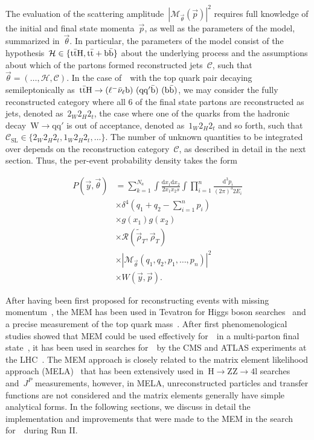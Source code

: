 The evaluation of the scattering amplitude~$|\mathcal{M}_{\vec{\theta}}(\vec{p})|^2$ requires full knowledge of the initial and final state momenta~$\vec{p}$, as well as the parameters of the model, summarized in~$\vec{\theta}$. In particular, the parameters of the model consist of the hypothesis~$\mathcal{H} \in \{\mathrm{t} \bar{\mathrm{t}} \mathrm{H}, \mathrm{t} \bar{\mathrm{t}} + \mathrm{b}\bar{\mathrm{b}}\}$ about the underlying process and the assumptions about which of the partons formed reconstructed jets~$\mathcal{C}$, such that~$\vec{\theta} = (\dots, \mathcal{H}, \mathcal{C})$. In the case of~\ttH~with the top quark pair decaying semileptonically as~$\mathrm{t} \bar{\mathrm{t}} \mathrm{H} \rightarrow (\ell^- \bar{\mathrm{\nu}}_\ell \mathrm{b})\ (\mathrm{q} \mathrm{q}' \bar{\mathrm{b}})\ (\mathrm{b} \bar{\mathrm{b}})$, we may consider the fully reconstructed category where all 6 of the final state partons are reconstructed as jets, denoted as~$2_W 2_H 2_t$, the case where one of the quarks from the hadronic decay~$\mathrm{W} \rightarrow \mathrm{q} \mathrm{q}'$ is out of acceptance, denoted as~$1_W 2_H 2_t$ and so forth, such that~$\mathcal{C}_{\mathrm{SL}} \in \{ 2_W 2_H 2_t, 1_W 2_H 2_t, \dots \}$. The number of unknown quantities to be integrated over depends on the reconstruction category~$\mathcal{C}$, as described in detail in the next section. 
Thus, the per-event probability density takes the form

\begin{align}
\label{eq:mem_definition}
P(\vec{y}, \vec{\theta}) &= \sum_{k=1}^{N_a} \int \frac{\mathrm{d}x_1 \mathrm{d}x_2}{2 x_1 x_2 s} \int \prod_{i=1}^{n} \frac{\mathrm{d}^3 p_i}{(2\pi)^3 2 E_i} \\
&\times \delta^4 (q_1 + q_2 - \sum_{i=1}^n p_i)\\
&\times g(x_1) g(x_2) \\ 
&\times \mathcal{R}(\tilde{\vec{\rho}}_T, \vec{\rho}_T) \\ 
&\times |\mathcal{M}_{\vec{\theta}}(q_1, q_2, p_1, \dots, p_n)|^2 \\
&\times W(\vec{y}, \vec{p}).
\end{align}

After having been first proposed for reconstructing events with missing momentum~\cite{Kondo:1988yd}, the MEM has been used in Tevatron for Higgs boson searches~\cite{Aaltonen:2009dh,Aaltonen:2011rt} and a precise measurement of the top quark mass~\cite{D0topmass2004}. After first phenomenological studies showed that MEM could be used effectively for~\ttH~in a multi-parton final state~\cite{Artoisenet:2013vfa}, it has been used in searches for~\ttHbb~by the CMS and ATLAS experiments at the LHC~\cite{Aad:2015gra,Khachatryan:2015ila}. The MEM approach is closely related to the matrix element likelihood approach (MELA)~\cite{Gao:2010qx} that has been extensively used in~$\mathrm{H} \rightarrow \mathrm{ZZ} \rightarrow 4\mathrm{l}$ searches and~$J^P$ measurements, however, in MELA, unreconstructed particles and transfer functions are not considered and the matrix elements generally have simple analytical forms.
In the following sections, we discuss in detail the implementation and improvements that were made to the MEM in the search for~\ttHbb~during Run II.

